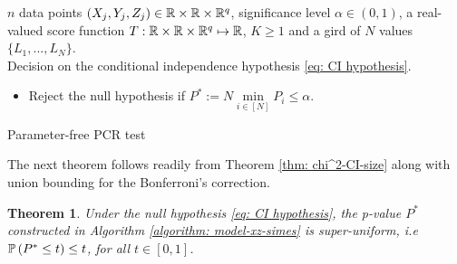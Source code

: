 \documentclass[11pt]{article}
\newtheorem{thm}[propo]{Theorem}
\begin{document}
\begin{algorithmic}[t]
	\begin{algorithm}
		\SetAlgoLined
		\REQUIRE $n$ data points $(X_j,Y_j,Z_j)\in {\mathbb R} \times {\mathbb R}\times {\mathbb R}^q$, significance level $\alpha\in(0,1)$, a real-valued score function $T:{\mathbb R}\times{\mathbb R}\times{\mathbb R}^q\mapsto {\mathbb R}$, $K\ge 1$ and a gird of $N$ values $\{L_1,...,L_N\}$.\\
		\ENSURE Decision on the conditional independence hypothesis \eqref{eq: CI hypothesis}.\\
	
	\begin{itemize}[leftmargin=*]
	\item Reject the null hypothesis if $P^*:= N\min\limits_{i\in[N]}^{} P_i\leq \alpha$.
	\end{itemize}


	


		\caption{Parameter-free PCR test}\label{algorithm: model-xz-simes}
	\end{algorithm}

%
\end{algorithmic}

The next theorem follows readily from Theorem \ref{thm: chi^2-CI-size} along with union bounding for the Bonferroni's correction. 
\begin{thm}
Under the null hypothesis \eqref{eq: CI hypothesis}, the p-value $P^*$ constructed in Algorithm \ref{algorithm: model-xz-simes} is super-uniform, i.e ${\mathbb P}\left(P^*\leq t\right) \leq t$, for all $t\in [0,1]$. 
  \end{thm}
\end{document}
